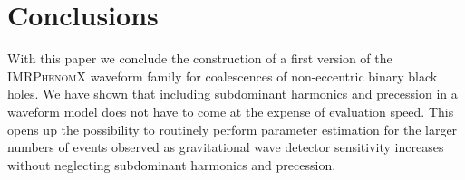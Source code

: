 \documentclass[%
aps,
prd,
amssymb,
amsmath,
amsfonts,
eqsecnum,
showpacs,
nofootinbib,
floatfix,
twocolumn,
twoside,
a4paper,
superscriptaddress
]{revtex4-1}
\newcommand{\phXF}{\textsc{IMRPhenomX}\xspace}
\newcommand{\phXPHM}{\textsc{IMRPhenomXPHM}\xspace}
\begin{document}





\section{Conclusions}\label{sec:conclusions}

With this paper we conclude the construction of a first version of the \phXF waveform family for coalescences of non-eccentric binary black holes. We have shown that including subdominant harmonics and precession in a waveform model does not have to come at the expense of evaluation speed.
This opens up the possibility to routinely perform parameter estimation for the larger numbers of events observed as gravitational wave detector sensitivity increases without neglecting subdominant harmonics and precession.
\end{document}
